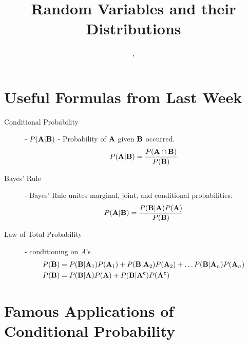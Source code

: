 \documentclass[11pt]{article}
\title{Random Variables and their Distributions}
\author{\shira, \tim}
\begin{document}
\maketitle

\begin{notes}

\section*{Useful Formulas from Last Week}
\begin{description}
	\item[Conditional Probability] - $P({\bf A}|{\bf B})$ - Probability of ${\bf A}$ given ${\bf B}$ occurred.
	$$ P({\bf A | B}) = \frac{P({\bf A \cap B})}{P({\bf B})}$$
	\item[Bayes' Rule] - Bayes' Rule unites marginal, joint, and conditional probabilities.
	\[P({\bf A}|{\bf B}) = \frac{P({\bf B}|{\bf A})P({\bf A})}{P({\bf B})}\]

	\item[Law of Total Probability] - conditioning on $A$'s
   \begin{align*} 
P({\bf B}) &= P({\bf B} | {\bf A}_1)P({\bf A}_1) + P({\bf B} | {\bf A}_2)P({\bf A}_2) + \ldots  P({\bf B} | {\bf A}_n)P({\bf A}_n)\\
P({\bf B}) &= P({\bf B} | {\bf A})P({\bf A}) + P({\bf B} | {\bf A^c})P({\bf A^c}) \\
   \end{align*} 
\end{description}
\section*{Famous Applications of Conditional Probability}

\end{notes}
\end{document}
